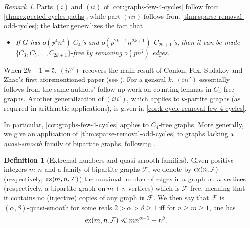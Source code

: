 \documentclass[reqno,11pt]{amsart}
\theoremstyle{definition}
\newtheorem{definition}[theorem]{Definition}
\theoremstyle{remark}
\newtheorem*{remark}{Remark}
\numberwithin{equation}{section}
\newcommand{\mF}{\mathcal{F}}
\newcommand{\ex}{\textnormal{ex}}
\begin{document}
\begin{remark}
Parts $(i)$ and $(ii)$ of \cref{cor:graphs-few-4-cycles} follow from \cref{thm:expected-cycles-paths}, while part $(iii)$ follows from \cref{thm:sparse-removal-odd-cycles}; the latter generalizes the fact that 
\begin{itemize}
    \item[$(iii').$] \emph{If $G$ has $o(p^4n^4)$ $C_4$'s and $o(p^{2k+1} n^{2k+1})$ $C_{2k+1}$'s, then it can be made $\{C_3, C_5, \ldots, C_{2k+1}\}$-free by removing $o(pn^2)$ edges.}
\end{itemize}
When $2k+1 = 5$, $(iii')$ recovers the main result of Conlon, Fox, Sudakov and Zhao's first aforementioned paper (see \cite[Theorem 1.2]{conlon2021regularity}). For a general $k$, $(iii')$ essentially follows from the same authors' follow-up work on counting lemmas in $C_4$-free graphs. %
Another generalization of $(iii')$, which applies to $k$-partite graphs (as required in arithmetic applications), is given in \cref{cor:k-cycle-removal-few-4-cycles}. %
\end{remark}

In particular, \cref{cor:graphs-few-4-cycles} applies to $C_4$-free graphs. More generally, we give an application of \cref{thm:sparse-removal-odd-cycles} to graphs lacking a \emph{quasi-smooth} family of bipartite graphs, following \cite{jiang2021bipartite,allen2014turan}.

\begin{definition}[Extremal numbers and quasi-smooth families] \label{def:quasi-smooth}
Given positive integers $m, n$ and a family of bipartite graphs $\mF$, we denote by $\ex(n, \mF)$ (respectively, $\ex(m, n, \mF)$) the maximal number of edges in a graph on $n$ vertices (respectively, a bipartite graph on $m+n$ vertices) which is $\mF$-free, meaning that it contains no (injective) copies of any graph in $\mF$. We then say that $\mF$ is $(\alpha, \beta)$-quasi-smooth for some reals $2 > \alpha > \beta \ge 1$ iff for $n \ge m \ge 1$, one has
\[
    \ex(m, n, \mF) \ll m n^{\alpha - 1} + n^\beta.
\]
\end{definition}
\end{document}
